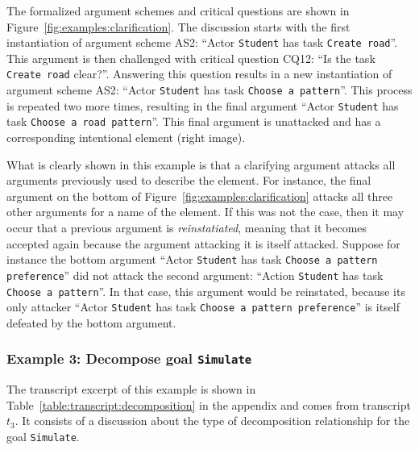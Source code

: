 The formalized argument schemes and critical questions are shown in Figure~\ref{fig:examples:clarification}. The discussion starts with the first instantiation of argument scheme AS2: ``Actor \texttt{Student} has task \texttt{Create road}''. This argument is then challenged with critical question CQ12: ``Is the task \texttt{Create road} clear?''. Answering this question results in a new instantiation of argument scheme AS2: ``Actor \texttt{Student} has task \texttt{Choose a pattern}''. This process is repeated two more times, resulting in the final argument ``Actor \texttt{Student} has task \texttt{Choose a road pattern}''. This final argument is unattacked and has a corresponding intentional element (right image). 

What is clearly shown in this example is that a clarifying argument attacks all arguments previously used to describe the element. For instance, the final argument on the bottom of Figure~\ref{fig:examples:clarification} attacks all three other arguments for a name of the element. If this was not the case, then it may occur that a previous argument is \emph{reinstatiated}, meaning that it becomes accepted again because the argument attacking it is itself attacked. Suppose for instance the bottom argument ``Actor \texttt{Student} has task \texttt{Choose a pattern preference}'' did not attack the second argument: ``Action \texttt{Student} has task \texttt{Choose a pattern}''. In that case, this argument would be reinstated, because its only attacker ``Actor \texttt{Student} has task \texttt{Choose a pattern preference}'' is itself defeated by the bottom argument.

\subsubsection{Example 3: Decompose goal \texttt{Simulate}}

The transcript excerpt of this example is shown in Table~\ref{table:transcript:decomposition} in the appendix and comes from transcript $t_3$. It consists of a discussion about the type of decomposition relationship for the goal \texttt{Simulate}.

